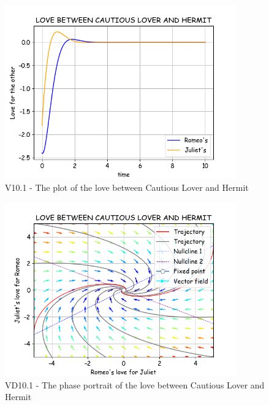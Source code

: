 \begin{figure}[!htbp]
    \centering
    \includegraphics[width=100mm]{image/bt2/plot10.1.png}
    \caption{V10.1 - The plot of the love between Cautious Lover and Hermit}
\end{figure}
\begin{figure}[!htbp]
    \centering
    \includegraphics[width=100mm]{image/bt2/pp10.1.png}
    \caption{VD10.1 - The phase portrait of the love between Cautious Lover and Hermit}
\end{figure}

